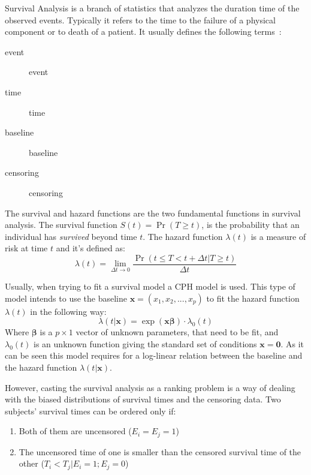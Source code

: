 
Survival Analysis is a branch of statistics that analyzes the duration time of the observed
events. Typically it refers to the time to the failure of a physical component or to death of a
patient. It usually defines the following terms~\cite{neural:survival-analysis}:

\begin{description}
  \item[\Gls{event} ] \glsdesc{event}
  \item[\Gls{time} ] \glsdesc{time}
  \item[\Gls{baseline} ] \glsdesc{baseline}
  \item[\Gls{censoring}] \glsdesc{censoring}
\end{description}

The survival and hazard functions are the two fundamental functions in survival analysis. The
survival function \( S(t) = \Pr(T \ge t) \), is the probability that an individual has
\emph{survived} beyond time \( t \). The hazard function \( \lambda(t) \) is a measure of risk at 
time \( t \) and it's defined as:
~\cite{medical:cox}
\[
  \lambda(t) = \lim_{\Delta t \rightarrow 0}
  \frac{\Pr(t \le T < t + \Delta t | T \ge t)}{\Delta t}
\]

Usually, when trying to fit a survival model a \gls{CPH} model is used. This type of model
intends to use the \gls{baseline} \( \bm{x} = (x_1, x_2, ..., x_p) \)
to fit the hazard function \( \lambda(t) \)
in the following way:
\[
  \lambda(t | \bm{x}) = \exp(\bm{x}\bm{\beta}) \cdot \lambda_0 (t)
\]
Where \( \bm{\beta} \) is a \( p \times 1 \) vector of unknown parameters, that need to be fit, 
and \( \lambda_0(t) \) is an unknown function giving the standard set of conditions 
\( \bm{x} = \bm{0} \). As it can be seen this model requires for a log-linear relation between
the \gls{baseline}  and the hazard function \( \lambda(t | \bm{x}) \).

However, casting the survival analysis as a ranking problem is a way of dealing with the biased
distributions of survival times and the censoring data. Two subjects' survival times can be 
ordered only if:
\begin{enumerate}[noitemsep, topsep=0pt]
  \item Both of them are uncensored (\( E_i = E_j = 1\))
  \item The uncensored time of one is smaller than the censored survival time of the other
  (\( T_i < T_j | E_i = 1; E_j = 0 \))
\end{enumerate}

